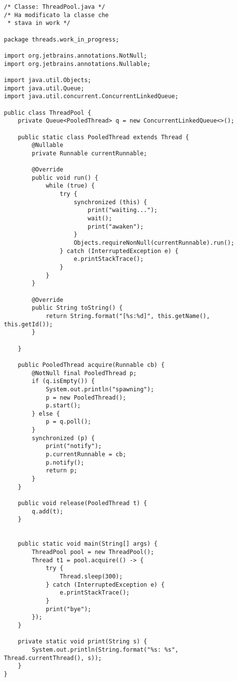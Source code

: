 \begin{lstlisting}
/* Classe: ThreadPool.java */
/* Ha modificato la classe che
 * stava in work */

package threads.work_in_progress;

import org.jetbrains.annotations.NotNull;
import org.jetbrains.annotations.Nullable;

import java.util.Objects;
import java.util.Queue;
import java.util.concurrent.ConcurrentLinkedQueue;

public class ThreadPool {
    private Queue<PooledThread> q = new ConcurrentLinkedQueue<>();

    public static class PooledThread extends Thread {
        @Nullable
        private Runnable currentRunnable;

        @Override
        public void run() {
            while (true) {
                try {
                    synchronized (this) {
                        print("waiting...");
                        wait();
                        print("awaken");
                    }
                    Objects.requireNonNull(currentRunnable).run();
                } catch (InterruptedException e) {
                    e.printStackTrace();
                }
            }
        }

        @Override
        public String toString() {
            return String.format("[%s:%d]", this.getName(), this.getId());
        }

    }

    public PooledThread acquire(Runnable cb) {
        @NotNull final PooledThread p;
        if (q.isEmpty()) {
            System.out.println("spawning");
            p = new PooledThread();
            p.start();
        } else {
            p = q.poll();
        }
        synchronized (p) {
            print("notify");
            p.currentRunnable = cb;
            p.notify();
            return p;
        }
    }

    public void release(PooledThread t) {
        q.add(t);
    }


    public static void main(String[] args) {
        ThreadPool pool = new ThreadPool();
        Thread t1 = pool.acquire(() -> {
            try {
                Thread.sleep(300);
            } catch (InterruptedException e) {
                e.printStackTrace();
            }
            print("bye");
        });
    }

    private static void print(String s) {
        System.out.println(String.format("%s: %s", Thread.currentThread(), s));
    }
} 

\end{lstlisting}